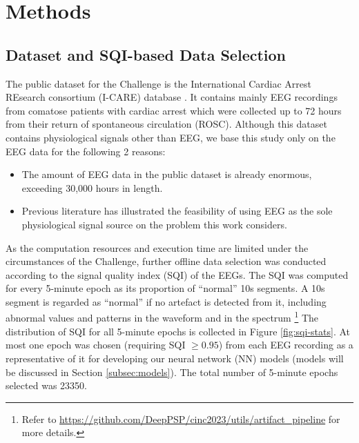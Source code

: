 \section{Methods}
\label{sec:methods}


\subsection{Dataset and SQI-based Data Selection}
\label{subsec:data_selection}

The public dataset for the Challenge is the International Cardiac Arrest REsearch consortium (I-CARE) database \cite{ICAREDatabase}. It contains mainly EEG recordings from comatose patients with cardiac arrest which were collected up to 72 hours from their return of spontaneous circulation (ROSC). Although this dataset contains physiological signals other than EEG, we base this study only on the EEG data for the following 2 reasons:
\begin{itemize}
    \item The amount of EEG data in the public dataset is already enormous, exceeding 30,000 hours in length.
    \item Previous literature \cite{Zheng_2021_coma} has illustrated the feasibility of using EEG as the sole physiological signal source on the problem this work considers.
\end{itemize}

As the computation resources and execution time are limited under the circumstances of the Challenge, further offline data selection was conducted according to the signal quality index (SQI) of the EEGs. The SQI was computed for every 5-minute epoch as its proportion of ``normal'' 10s segments. A 10s segment is regarded as ``normal'' if no artefact is detected from it, including abnormal values and patterns in the waveform and in the spectrum \footnote{Refer to \url{https://github.com/DeepPSP/cinc2023/utils/artifact_pipeline} for more details.} The distribution of SQI for all 5-minute epochs is collected in Figure \ref{fig:sqi-stats}. At most one epoch was chosen (requiring SQI $\ge 0.95$) from each EEG recording as a representative of it for developing our neural network (NN) models (models will be discussed in Section \ref{subsec:models}). The total number of 5-minute epochs selected was 23350.

